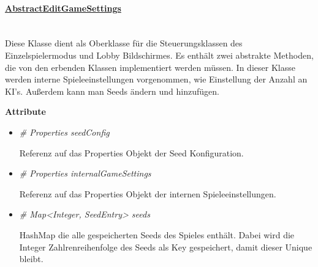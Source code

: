         \paragraph{\underline{AbstractEditGameSettings}}\label{adgs} \mbox{}\\
            Diese Klasse dient als Oberklasse für die Steuerungsklassen des
            Einzelspielermodus und Lobby Bildschirmes. Es enthält zwei abstrakte 
            Methoden, die von den erbenden Klassen implementiert werden müssen.
            In dieser Klasse werden interne Spieleeinstellungen vorgenommen, 
            wie Einstellung der Anzahl an KI's. Außerdem kann man 
            Seeds ändern und hinzufügen. \par
            
            \textbf{Attribute}
            \begin{itemize}
                \item \textit{\# Properties seedConfig}  
                    \begin{leftbar}[0.9\linewidth]
                        Referenz auf das Properties Objekt der Seed Konfiguration.
                    \end{leftbar}
                \item  \textit{\# Properties internalGameSettings} 
                    \begin{leftbar}[0.9\linewidth]
                        Referenz auf das Properties Objekt der internen 
                        Spieleeinstellungen.
                    \end{leftbar}
                \item  \textit{\# Map<Integer, SeedEntry> seeds} 
                    \begin{leftbar}[0.9\linewidth]
                        HashMap die alle gespeicherten Seeds des Spieles 
                        enthält. Dabei wird die Integer Zahlrenreihenfolge
                        des Seeds als Key gespeichert, damit dieser Unique
                        bleibt.
                    \end{leftbar}
            \end{itemize}
               
